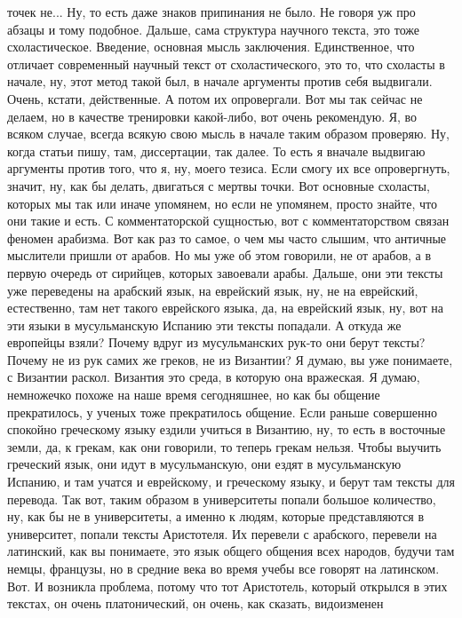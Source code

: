 точек не... Ну, то есть даже знаков припинания не было. Не говоря уж про абзацы
и тому подобное. Дальше, сама структура научного текста, это тоже
схоластическое. Введение, основная мысль заключения. Единственное, что отличает
современный научный текст от схоластического, это то, что схоласты в начале, ну,
этот метод такой был, в начале аргументы против себя выдвигали. Очень, кстати,
действенные. А потом их опровергали. Вот мы так сейчас не делаем, но в качестве
тренировки какой-либо, вот очень рекомендую. Я, во всяком случае, всегда всякую
свою мысль в начале таким образом проверяю. Ну, когда статьи пишу, там,
диссертации, так далее. То есть я вначале выдвигаю аргументы против того, что я,
ну, моего тезиса. Если смогу их все опровергнуть, значит, ну, как бы делать,
двигаться с мертвы точки. Вот основные схоласты, которых мы так или иначе
упомянем, но если не упомянем, просто знайте, что они такие и есть. С
комментаторской сущностью, вот с комментаторством связан феномен арабизма. Вот
как раз то самое, о чем мы часто слышим, что античные мыслители пришли от
арабов. Но мы уже об этом говорили, не от арабов, а в первую очередь от
сирийцев, которых завоевали арабы. Дальше, они эти тексты уже переведены на
арабский язык, на еврейский язык, ну, не на еврейский, естественно, там нет
такого еврейского языка, да, на еврейский язык, ну, вот на эти языки в
мусульманскую Испанию эти тексты попадали. А откуда же европейцы взяли? Почему
вдруг из мусульманских рук-то они берут тексты? Почему не из рук самих же
греков, не из Византии? Я думаю, вы уже понимаете, с Византии раскол. Византия
это среда, в которую она вражеская. Я думаю, немножечко похоже на наше время
сегодняшнее, но как бы общение прекратилось, у ученых тоже прекратилось общение.
Если раньше совершенно спокойно греческому языку ездили учиться в Византию, ну,
то есть в восточные земли, да, к грекам, как они говорили, то теперь грекам
нельзя. Чтобы выучить греческий язык, они идут в мусульманскую, они ездят в
мусульманскую Испанию, и там учатся и еврейскому, и греческому языку, и берут
там тексты для перевода. Так вот, таким образом в университеты попали большое
количество, ну, как бы не в университеты, а именно к людям, которые
представляются в университет, попали тексты Аристотеля. Их перевели с арабского,
перевели на латинский, как вы понимаете, это язык общего общения всех народов,
будучи там немцы, французы, но в средние века во время учебы все говорят на
латинском. Вот. И возникла проблема, потому что тот Аристотель, который открылся
в этих текстах, он очень платонический, он очень, как сказать, видоизменен

